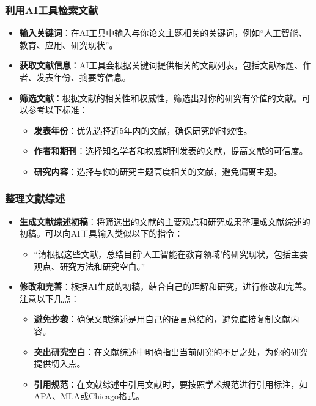 \subsubsection{利用AI工具检索文献}
\begin{itemize}
    \item \textbf{输入关键词}：在AI工具中输入与你论文主题相关的关键词，例如“人工智能、教育、应用、研究现状”。
    \item \textbf{获取文献信息}：AI工具会根据关键词提供相关的文献列表，包括文献标题、作者、发表年份、摘要等信息。
    \item \textbf{筛选文献}：根据文献的相关性和权威性，筛选出对你的研究有价值的文献。可以参考以下标准：
    \begin{itemize}
        \item \textbf{发表年份}：优先选择近5年内的文献，确保研究的时效性。
        \item \textbf{作者和期刊}：选择知名学者和权威期刊发表的文献，提高文献的可信度。
        \item \textbf{研究内容}：选择与你的研究主题高度相关的文献，避免偏离主题。
    \end{itemize}
\end{itemize}

\subsubsection{整理文献综述}
\begin{itemize}
    \item \textbf{生成文献综述初稿}：将筛选出的文献的主要观点和研究成果整理成文献综述的初稿。可以向AI工具输入类似以下的指令：
    \begin{itemize}
        \item “请根据这些文献，总结目前‘人工智能在教育领域’的研究现状，包括主要观点、研究方法和研究空白。”
    \end{itemize}
    \item \textbf{修改和完善}：根据AI生成的初稿，结合自己的理解和研究，进行修改和完善。注意以下几点：
    \begin{itemize}
        \item \textbf{避免抄袭}：确保文献综述是用自己的语言总结的，避免直接复制文献内容。
        \item \textbf{突出研究空白}：在文献综述中明确指出当前研究的不足之处，为你的研究提供切入点。
        \item \textbf{引用规范}：在文献综述中引用文献时，要按照学术规范进行引用标注，如APA、MLA或Chicago格式。
    \end{itemize}
\end{itemize}

